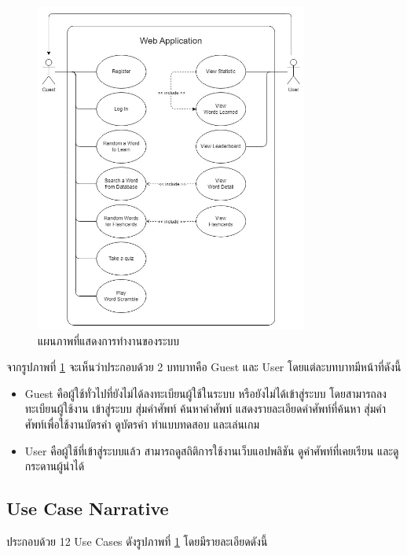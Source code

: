 \documentclass[12pt,oneside,openright,a4paper]{cpe-thai-project}
\begin{document}
\begin{figure}[!h]\centering
	\includegraphics[width=0.8\textwidth, keepaspectratio=true]{image/chap3/UseCaseDiagram.jpg}
	\caption{แผนภาพที่แสดงการทำงานของระบบ}\label{fig:UseCaseDiagram}
\end{figure}

\hspace{1cm}
จากรูปภาพที่ \ref{fig:UseCaseDiagram} จะเห็นว่าประกอบด้วย 2 บทบาทคือ Guest และ User โดยแต่ละบทบาทมีหน้าที่ดังนี้
\begin{itemize}
	\item Guest คือผู้ใช้ทั่วไปที่ยังไม่ได้ลงทะเบียนผู้ใช้ในระบบ หรือยังไม่ได้เข้าสู่ระบบ
	      โดยสามารถลงทะเบียนผู้ใช้งาน เข้าสู่ระบบ สุ่มคำศัพท์ ค้นหาคำศัพท์ แสดงรายละเอียดคำศัพท์ที่ค้นหา
	      สุ่มคำศัพท์เพื่อใช้งานบัตรคำ ดูบัตรคำ ทำแบบทดสอบ และเล่นเกม
	\item User คือผู้ใช้ที่เข้าสู่ระบบแล้ว สามารถดูสถิติการใช้งานเว็บแอปพลิชัน ดูคำศัพท์ที่เคยเรียน และดูกระดานผู้นำได้
\end{itemize}

\pagebreak
\subsection{Use Case Narrative}
ประกอบด้วย 12 Use Cases ดังรูปภาพที่ \ref{fig:UseCaseDiagram} โดยมีรายละเอียดดังนี้
\end{document}
